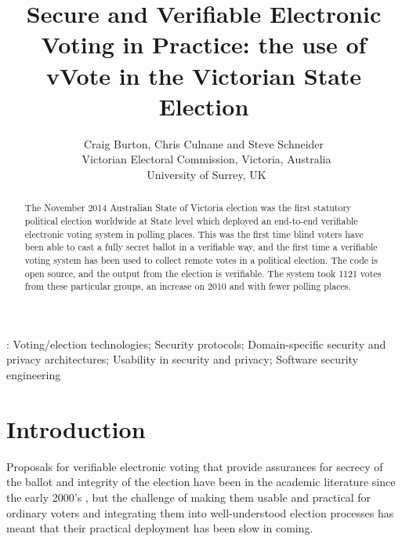 \documentclass[twocolumn]{article}
\begin{document}
\title{Secure and Verifiable Electronic Voting in Practice: the use of vVote in the Victorian State Election}

\author{Craig Burton, Chris Culnane and Steve Schneider \\ \small \  Victorian Electoral Commission, Victoria, Australia \\ \small \  University of Surrey, UK}



\maketitle

: Voting/election technologies; Security protocols;
Domain-specific security and privacy architectures; Usability in security and privacy; Software security engineering

\begin{abstract}
The November 2014 Australian State of Victoria election was the first statutory political election worldwide at State level which deployed an end-to-end verifiable electronic voting system in polling places.  This was the first time blind voters have been able to cast a fully secret ballot in a verifiable way, and the first time a verifiable voting system has been used to collect remote votes in a political election.  The code is open source, and the output from the election is verifiable.  The system took 1121 votes from these particular groups, an increase on 2010 and with fewer polling places.
\end{abstract}

\section{Introduction}

Proposals for verifiable electronic voting that provide assurances for secrecy of the ballot and integrity of the election have been in the academic literature since the early 2000's \cite{neff01:e-vote,DBLP:journals/ieeesp/Chaum04,chaum05:e-vote,BenalohSimple06,VoteBox}, but the challenge of making them usable and practical for ordinary voters and integrating them into well-understood election processes has meant that their practical deployment has been slow in coming.  
\end{document}
